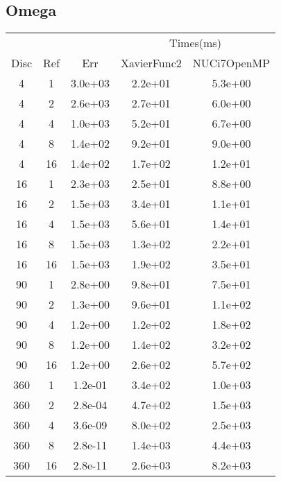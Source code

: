 \subsection{Omega}
\begin{center}
\begin{tabular}{c|c|c|c|c}
	&&&\multicolumn{2}{|c}{Times(ms)}\\
	Disc&Ref&Err&XavierFunc2&NUCi7OpenMP\\
\hline
4&1&3.0e+03&2.2e+01&5.3e+00\\
4&2&2.6e+03&2.7e+01&6.0e+00\\
4&4&1.0e+03&5.2e+01&6.7e+00\\
4&8&1.4e+02&9.2e+01&9.0e+00\\
4&16&1.4e+02&1.7e+02&1.2e+01\\
\hline
16&1&2.3e+03&2.5e+01&8.8e+00\\
16&2&1.5e+03&3.4e+01&1.1e+01\\
16&4&1.5e+03&5.6e+01&1.4e+01\\
16&8&1.5e+03&1.3e+02&2.2e+01\\
16&16&1.5e+03&1.9e+02&3.5e+01\\
\hline
90&1&2.8e+00&9.8e+01&7.5e+01\\
90&2&1.3e+00&9.6e+01&1.1e+02\\
90&4&1.2e+00&1.2e+02&1.8e+02\\
90&8&1.2e+00&1.4e+02&3.2e+02\\
90&16&1.2e+00&2.6e+02&5.7e+02\\
\hline
360&1&1.2e-01&3.4e+02&1.0e+03\\
360&2&2.8e-04&4.7e+02&1.5e+03\\
360&4&3.6e-09&8.0e+02&2.5e+03\\
360&8&2.8e-11&1.4e+03&4.4e+03\\
360&16&2.8e-11&2.6e+03&8.2e+03\\
\hline
\end{tabular}
\end{center}







